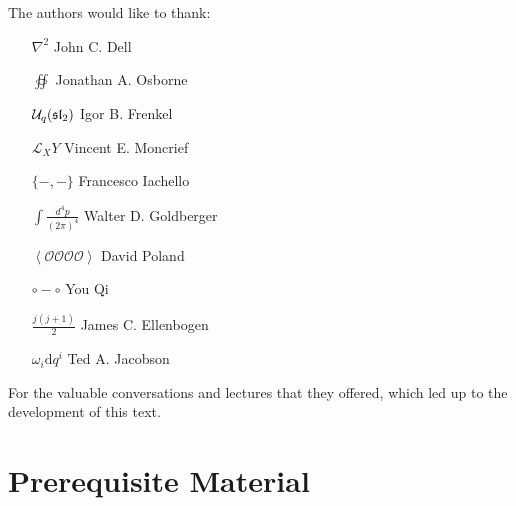\documentclass[12pt, twoside, openany]{book}
\newcommand{\1}{\mathbbm{1}}
\theoremstyle{definition}
\begin{document}
\begin{large}
	
		

	The authors would like to thank:
	\vspace{.5cm}
	\begin{center}
	\begin{varwidth}{\textwidth}
			\begin{itemize} 
				\renewcommand\labelitemi{$\square$}
				\setlength\itemsep{.2em}
				\item[$\nabla^2$] John C. Dell
				\item[$\oiint$] Jonathan A. Osborne
				\item[$\mathcal U_q(\frak{sl}_2)$] Igor B. Frenkel
				\item[$\mathcal L_X Y$] Vincent E. Moncrief
				\item[$\{-,- \}$] Francesco Iachello
				\item[$\int \frac{d^4 p}{(2\pi)^4}$] Walter D. Goldberger
				\item[$\left< \mathcal O \mathcal O \mathcal O \mathcal O \right>$] David Poland
				\item[$\circ - \circ$] You Qi
				\item[$\frac{j(j+1)}{2}$] James C. Ellenbogen
				\item[$\omega_i \mathrm d q^i$] Ted A. Jacobson
			\end{itemize}
	\end{varwidth}
	\end{center}
	\vspace{.5cm}
	For the valuable conversations and lectures that they offered, which led up to the development of this text.
	
\end{large}

\newpage

\setcounter{page}{1}

\part{Prerequisite Material}

%

%


\end{document}
